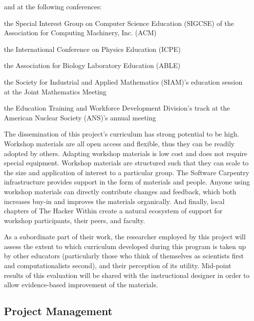 \documentclass{proposalnsf}
\newlength{\up}
\begin{document}
and at the following conferences:

\begin{compactitem}

\item
  the Special Interest Group on Computer Science Education (SIGCSE) of
  the Association for Computing Machinery, Inc. (ACM)

\item
  the International Conference on Physics Education (ICPE)

\item
  the Association for Biology Laboratory Education (ABLE)

\item
  the Society for Industrial and Applied Mathematics (SIAM)'s
  education session at the Joint Mathematics Meeting

\item
  the Education Training and Workforce Development Division's track at
  the American Nuclear Society (ANS)'s annual meeting

\end{compactitem}

The dissemination of this project's curriculum has strong potential to
be high. Workshop materials are all open access and flexible, thus
they can be readily adopted by others. Adapting workshop materials is
low cost and does not require special equipment. Workshop materials
are structured such that they can scale to the size and application of
interest to a particular group. The Software Carpentry infrastructure
provides support in the form of materials and people. Anyone using
workshop materials can directly contribute changes and feedback, which
both increases buy-in and improves the materials organically. And
finally, local chapters of The Hacker Within create a natural
ecosystem of support for workshop participants, their peers, and
faculty.

As a subordinate part of their work, the researcher employed by this
project will assess the extent to which curriculum developed during
this program is taken up by other educators (particularly those who
think of themselves as scientists first and computationalists second),
and their perception of its utility.  Mid-point results of this
evaluation will be shared with the instructional designer in order to
allow evidence-based improvement of the materials.

\subsection{Project Management}
\end{document}
